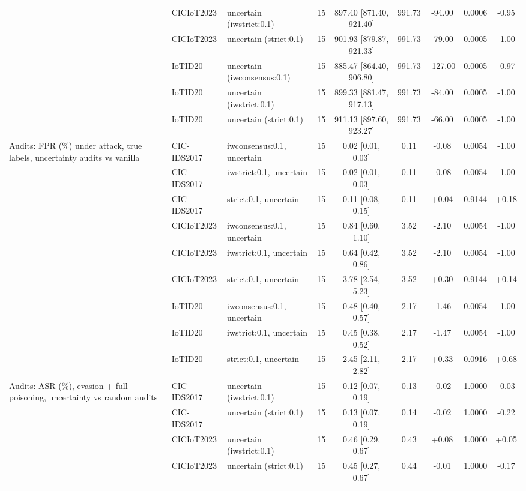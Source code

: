 \begin{table}[t]
\begin{tabular}{lllcccccc}
 & CICIoT2023 & uncertain (iwstrict:0.1) & 15 & 897.40 [871.40, 921.40] & 991.73 & -94.00 & 0.0006 & -0.95 \\
 & CICIoT2023 & uncertain (strict:0.1) & 15 & 901.93 [879.87, 921.33] & 991.73 & -79.00 & 0.0005 & -1.00 \\
 & IoTID20 & uncertain (iwconsensus:0.1) & 15 & 885.47 [864.40, 906.80] & 991.73 & -127.00 & 0.0005 & -0.97 \\
 & IoTID20 & uncertain (iwstrict:0.1) & 15 & 899.33 [881.47, 917.13] & 991.73 & -84.00 & 0.0005 & -1.00 \\
 & IoTID20 & uncertain (strict:0.1) & 15 & 911.13 [897.60, 923.27] & 991.73 & -66.00 & 0.0005 & -1.00 \\
Audits: FPR (\%) under attack, true labels, uncertainty audits vs vanilla & CIC-IDS2017 & iwconsensus:0.1, uncertain & 15 & 0.02 [0.01, 0.03] & 0.11 & -0.08 & 0.0054 & -1.00 \\
 & CIC-IDS2017 & iwstrict:0.1, uncertain & 15 & 0.02 [0.01, 0.03] & 0.11 & -0.08 & 0.0054 & -1.00 \\
 & CIC-IDS2017 & strict:0.1, uncertain & 15 & 0.11 [0.08, 0.15] & 0.11 & +0.04 & 0.9144 & +0.18 \\
 & CICIoT2023 & iwconsensus:0.1, uncertain & 15 & 0.84 [0.60, 1.10] & 3.52 & -2.10 & 0.0054 & -1.00 \\
 & CICIoT2023 & iwstrict:0.1, uncertain & 15 & 0.64 [0.42, 0.86] & 3.52 & -2.10 & 0.0054 & -1.00 \\
 & CICIoT2023 & strict:0.1, uncertain & 15 & 3.78 [2.54, 5.23] & 3.52 & +0.30 & 0.9144 & +0.14 \\
 & IoTID20 & iwconsensus:0.1, uncertain & 15 & 0.48 [0.40, 0.57] & 2.17 & -1.46 & 0.0054 & -1.00 \\
 & IoTID20 & iwstrict:0.1, uncertain & 15 & 0.45 [0.38, 0.52] & 2.17 & -1.47 & 0.0054 & -1.00 \\
 & IoTID20 & strict:0.1, uncertain & 15 & 2.45 [2.11, 2.82] & 2.17 & +0.33 & 0.0916 & +0.68 \\
Audits: ASR (\%), evasion + full poisoning, uncertainty vs random audits & CIC-IDS2017 & uncertain (iwstrict:0.1) & 15 & 0.12 [0.07, 0.19] & 0.13 & -0.02 & 1.0000 & -0.03 \\
 & CIC-IDS2017 & uncertain (strict:0.1) & 15 & 0.13 [0.07, 0.19] & 0.14 & -0.02 & 1.0000 & -0.22 \\
 & CICIoT2023 & uncertain (iwstrict:0.1) & 15 & 0.46 [0.29, 0.67] & 0.43 & +0.08 & 1.0000 & +0.05 \\
 & CICIoT2023 & uncertain (strict:0.1) & 15 & 0.45 [0.27, 0.67] & 0.44 & -0.01 & 1.0000 & -0.17 \\

\end{tabular}
\end{table}
